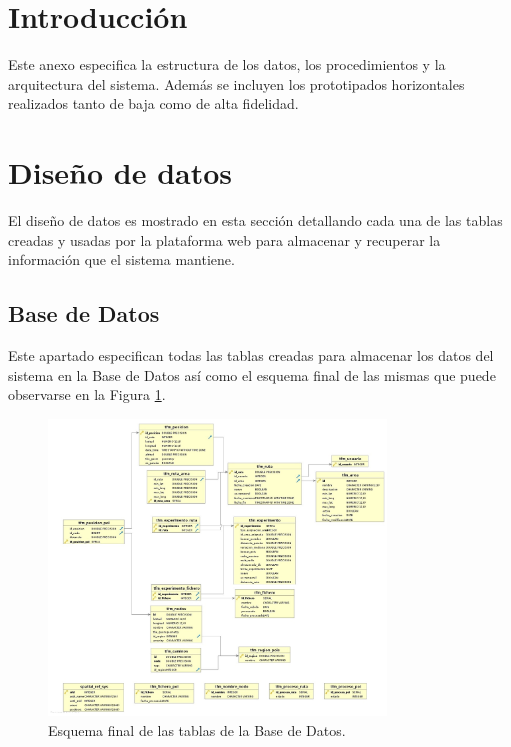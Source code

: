 
\section{Introducción}

Este anexo especifica la estructura de los datos, los procedimientos y la arquitectura del sistema. Además se incluyen los prototipados horizontales realizados tanto de baja como de alta fidelidad.

\section{Diseño de datos}

El diseño de datos es mostrado en esta sección detallando cada una de las tablas creadas y usadas por la plataforma web para almacenar y recuperar la información que el sistema mantiene.

\subsection{Base de Datos}

Este apartado especifican todas las tablas creadas para almacenar los datos del sistema en la Base de Datos así como el esquema final de las mismas que puede observarse en la Figura \ref{db-schema}.

\begin{figure}[!htbp]
  \centering
    \includegraphics[width=0.8\textwidth]{../img/db/db-schema.jpg}
  \caption{Esquema final de las tablas de la Base de Datos.}
  \label{db-schema}
\end{figure}

